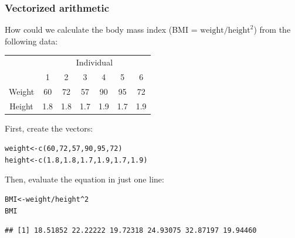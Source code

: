 \documentclass[color=usenames,dvipsnames]{beamer}\usepackage[]{graphicx}\usepackage[]{color}
\makeatletter
\newcommand{\hlnum}[1]{\textcolor[rgb]{0.69,0.494,0}{#1}}%
\newcommand{\hlopt}[1]{\textcolor[rgb]{0,0,0}{#1}}%
\newcommand{\hlstd}[1]{\textcolor[rgb]{0,0,0}{#1}}%
\newcommand{\hlkwb}[1]{\textcolor[rgb]{0,0.341,0.682}{#1}}%
\newcommand{\hlkwd}[1]{\textcolor[rgb]{0.004,0.004,0.506}{#1}}%
\newenvironment{kframe}{%
 \def\at@end@of@kframe{}%
 \ifinner\ifhmode%
  \def\at@end@of@kframe{\end{minipage}}%
  \begin{minipage}{\columnwidth}%
 \fi\fi%
 \def\FrameCommand##1{\hskip\@totalleftmargin \hskip-\fboxsep
 \colorbox{shadecolor}{##1}\hskip-\fboxsep
     \hskip-\linewidth \hskip-\@totalleftmargin \hskip\columnwidth}%
 \MakeFramed {\advance\hsize-\width
   \@totalleftmargin\z@ \linewidth\hsize
   \@setminipage}}%
 {\par\unskip\endMakeFramed%
 \at@end@of@kframe}
\newenvironment{knitrout}{}{} %
\makeatother
\begin{document}
\begin{frame}[fragile]
  \frametitle{Vectorized arithmetic}
  How could we calculate the body mass index (BMI = $\text{weight}/\text{height}^2$) from the following data:
  \begin{center}
    \begin{tabular}{ccccccc}
      \hline
      & \multicolumn{6}{c}{Individual} \\
      \cline{2-7}
      & 1 & 2 & 3 & 4 & 5 & 6 \\
      \hline
      Weight & 60 & 72 & 57 & 90 & 95 & 72 \\
      Height & 1.8 & 1.8 & 1.7 & 1.9 & 1.7 & 1.9 \\
      \hline
    \end{tabular}
  \end{center}
  \pause
  First, create the vectors:
\begin{knitrout}
\color{fgcolor}\begin{kframe}
\begin{alltt}
\hlstd{weight} \hlkwb{<-} \hlkwd{c}\hlstd{(}\hlnum{60}\hlstd{,} \hlnum{72}\hlstd{,} \hlnum{57}\hlstd{,} \hlnum{90}\hlstd{,} \hlnum{95}\hlstd{,} \hlnum{72}\hlstd{)}
\hlstd{height} \hlkwb{<-} \hlkwd{c}\hlstd{(}\hlnum{1.8}\hlstd{,} \hlnum{1.8}\hlstd{,} \hlnum{1.7}\hlstd{,} \hlnum{1.9}\hlstd{,} \hlnum{1.7}\hlstd{,} \hlnum{1.9}\hlstd{)}
\end{alltt}
\end{kframe}
\end{knitrout}
  \pause
  Then, evaluate the equation in just one line:
\begin{knitrout}\small
{}\color{fgcolor}\begin{kframe}
\begin{alltt}
\hlstd{BMI} \hlkwb{<-} \hlstd{weight}\hlopt{/}\hlstd{height}\hlopt{^}\hlnum{2}
\hlstd{BMI}
\end{alltt}
\begin{verbatim}
## [1] 18.51852 22.22222 19.72318 24.93075 32.87197 19.94460
\end{verbatim}
\end{kframe}
\end{knitrout}
\end{frame}
\end{document}
